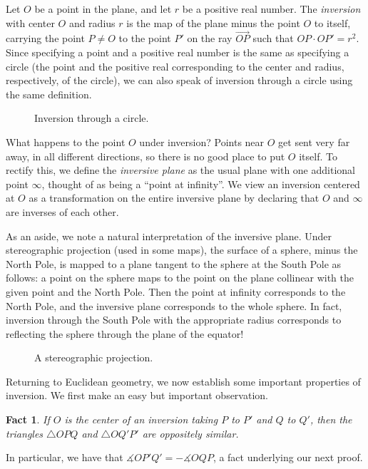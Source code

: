 \documentclass[12pt]{book}
\numberwithin{exc}{section}
\numberwithin{figure}{section}
\newtheorem{fact}[theorem]{Fact}
\numberwithin{equation}{theorem}
\def\dang{\measuredangle} %
\def\ray#1{\overrightarrow{#1}}
\begin{document}
Let $O$ be a point in the plane, and let $r$ be a positive real number. The 
\emph{inversion} 
with center $O$ and radius $r$ is the map of the plane minus the point $O$
to itself, carrying the point $P \neq O$ to the point $P'$ 
on the ray $\ray{OP}$ such that $OP \cdot OP' = r^2$. Since 
specifying a point and a positive real number is the same as 
specifying a circle (the point and the positive real corresponding to 
the center and radius, respectively, of the circle), we can also 
speak of inversion through a circle using the same definition. 
\begin{figure}[ht]
\caption{Inversion through a circle.}
\end{figure}

What happens to the point $O$ under inversion? 
Points near $O$ get sent very far 
away, in all different directions, so there is no good place to put 
$O$ itself. To rectify this, we define
the \emph{inversive plane} 
 as the usual plane with one 
additional point $\infty$, thought of as being a ``point at infinity''.
 We view  
an inversion centered at $O$ as a transformation on 
the entire inversive plane by declaring that $O$ and 
$\infty$ are inverses of each other.

As an aside, we note a natural interpretation of the inversive plane. 
Under stereographic projection (used in some maps), 
the surface of a 
sphere, minus the North Pole, is mapped to a plane tangent to the 
sphere at the South Pole as follows: a point on the sphere maps to 
the point on the plane collinear with the given point and the North 
Pole. Then the point at infinity corresponds to the North Pole, and 
the inversive plane corresponds to the whole sphere. In fact, 
inversion through the South Pole with the appropriate radius 
corresponds to reflecting the sphere through the plane of the equator! 
\begin{figure}[ht]
\caption{A stereographic projection.}
\end{figure}

Returning to Euclidean geometry, we now establish some important 
properties of inversion. We first make an easy but important 
observation.

\begin{fact} \label{fac:invsim}
If $O$ is the center of an inversion taking $P$ to $P'$ and $Q$ to 
$Q'$, then the triangles $\triangle OPQ$ and $\triangle OQ'P'$ 
are oppositely similar.
\end{fact}
In particular, we have that $\dang OP'Q' = -\dang OQP$, a fact 
underlying our next proof.
\end{document}
